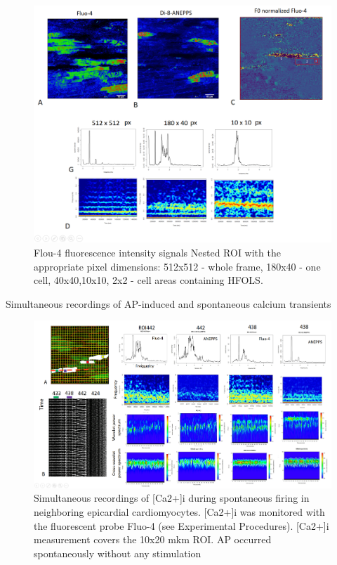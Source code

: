 \documentclass{biophys-new}
\begin{document}
\begin{figure}[hbt!]
\centering
\includegraphics[width=0.9\linewidth]{fig7.png}
\caption{Flou-4 fluorescence intensity signals Nested ROI with the appropriate pixel dimensions: 512x512 - whole frame, 180x40 - one cell, 40x40,10x10, 2x2 - cell areas containing HFOLS. }
\label{fig:fig7}
\end{figure}


Simultaneous recordings of AP-induced and spontaneous calcium transients

\begin{figure}[hbt!]
\centering
\includegraphics[width=0.9\linewidth]{fig8.png}
\caption{Simultaneous recordings of [Ca2+]i during spontaneous firing in neighboring epicardial cardiomyocytes. [Ca2+]i was monitored with the fluorescent probe Fluo-4 (see Experimental Procedures). [Ca2+]i measurement covers the 10x20 mkm ROI. AP occurred spontaneously without any stimulation}
\label{fig:fig8}
\end{figure}
\end{document}
